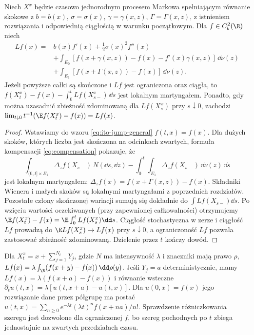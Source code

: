 \begin{twierdzenie}
\label{th:jump-generator}
Niech $X^x$ będzie czasowo jednorodnym procesem Markowa
spełniającym równanie skokowe
z $b=b(x)$, $\sigma=\sigma(x)$, $\gamma=\gamma(x,z)$,
$\Gamma=\Gamma(x,z)$, z istnieniem rozwiązania i
odpowiednią ciągłością w warunku początkowym.
Dla $f\in C_b^2(\R)$ niech
\[
\begin{split}
Lf(x)={}&b(x)f'(x)+\frac12\sigma(x)^2f''(x)\\
&+\int_{E_0}[f(x+\gamma(x,z))-f(x)-f'(x)\gamma(x,z)]\,\dd\nu(z)\\
&+\int_{E_1}[f(x+\Gamma(x,z))-f(x)]\,\dd\nu(z).
\end{split}
\tag{12.6}\label{eq:jump-generator}
\]
Jeżeli powyższe całki są skończone i $Lf$ jest
ograniczona oraz ciągła, to
$f(X_t^x)-f(x)-\int_0^tLf(X_{s-}^x)\,\dd s$
jest lokalnym martyngałem. Ponadto, gdy można
uzasadnić zbieżność zdominowaną dla $Lf(X_s^x)$ przy
$s\downarrow0$, zachodzi
$\lim_{t\downarrow0}t^{-1}(\E f(X_t^x)-f(x))=Lf(x)$.
\end{twierdzenie}
\begin{proof}
Wstawiamy do wzoru \eqref{eq:ito-jump-general}
$f(t,x)=f(x)$. Dla dużych skoków, których liczba jest
skończona na odcinkach zwartych, formuła kompensacji
\eqref{eq:compensation} pokazuje, że
\[
\int_{(0,t]\times E_1}\Delta_zf(X_{s-})\,N(\dd s,\dd z)
-\int_0^t\int_{E_1}\Delta_zf(X_{s-})\,\dd\nu(z)\,\dd s
\]
jest lokalnym martyngałem; $\Delta_zf(x)=f(x+\Gamma(x,z))-f(x)$.
Składniki Wienera i małych skoków są lokalnymi martyngałami
z poprzednich rozdziałów. Pozostałe człony skończonej
wariacji sumują się dokładnie do $\int Lf(X_{s-})\dd s$.
Po wzięciu wartości oczekiwanych (przy zapewnionej
całkowalności) otrzymujemy
$\E f(X_t^x)-f(x)=\E\int_0^tLf(X_s^x)\dd s$.
Ciągłość stochastyczna w zerze i ciągłość $Lf$ prowadzą
do $\E Lf(X_s^x)\to Lf(x)$ przy $s\downarrow0$,
a ograniczoność $Lf$ pozwala zastosować zbieżność
zdominowaną. Dzielenie przez $t$ kończy dowód.
\end{proof}

\begin{przyklad}
Dla $X_t^x=x+\sum_{j=1}^{N_t}Y_j$, gdzie
$N$ ma intensywność $\lambda$ i znaczniki mają prawo $\rho$,
$Lf(x)=\lambda\int_{\R}(f(x+y)-f(x))\,\dd\rho(y)$.
Jeśli $Y_j=a$ deterministycznie, mamy
$Lf(x)=\lambda(f(x+a)-f(x))$ i równanie wsteczne
$\partial_tu(t,x)=\lambda[u(t,x+a)-u(t,x)]$.
Dla $u(0,x)=f(x)$ jego rozwiązanie dane przez
półgrupę ma postać
$u(t,x)=\sum_{n\ge0}e^{-\lambda t}(\lambda t)^n f(x+na)/n!$.
Sprawdzenie różniczkowania szeregu jest dozwolone dla
ograniczonej $f$, bo szereg pochodnych po $t$ zbiega
jednostajnie na zwartych przedziałach czasu.
\end{przyklad}

